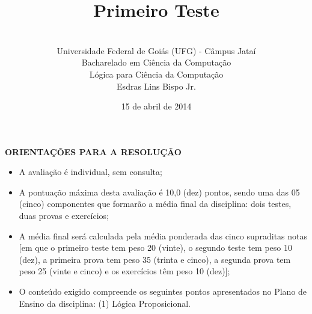 \documentclass[12pt,a4paper,oneside]{article}
\author{\\Universidade Federal de Goiás (UFG) - Câmpus Jataí\\Bacharelado em Ciência da Computação \\Lógica para Ciência da Computação \\Esdras Lins Bispo Jr.}
\date{15 de abril de 2014}
\title{\sc \huge Primeiro Teste}
\begin{document}
\maketitle

{\bf ORIENTAÇÕES PARA A RESOLUÇÃO}

\begin{itemize}
	\item A avaliação é individual, sem consulta;
	\item A pontuação máxima desta avaliação é 10,0 (dez) pontos, sendo uma das 05 (cinco) componentes que formarão a média final da disciplina: dois testes, duas provas e exercícios;
	\item A média final será calculada pela média ponderada das cinco supraditas notas [em que o primeiro teste tem peso 20 (vinte), o segundo teste tem peso 10 (dez), a primeira prova tem peso 35 (trinta e cinco), a segunda prova tem peso 25 (vinte e cinco) e os exercícios têm peso 10 (dez)];
	\item O conteúdo exigido compreende os seguintes pontos apresentados no Plano de Ensino da disciplina: (1) Lógica Proposicional.
\end{itemize}

\begin{center}
\end{center}

\newpage
\end{document}
